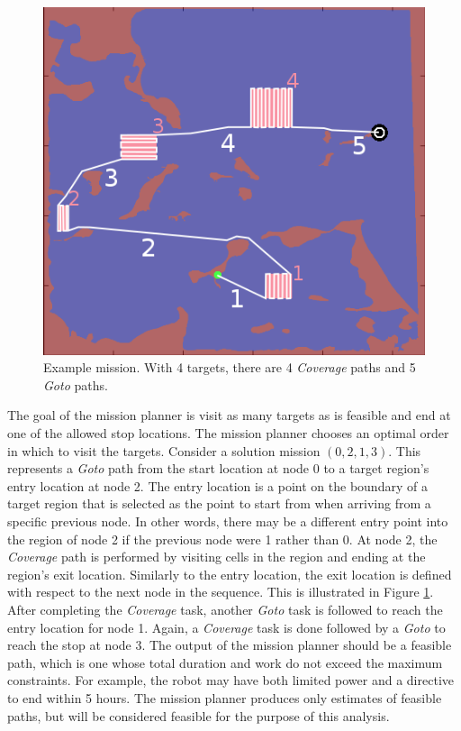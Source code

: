 \documentclass{tamuccthesis}
\begin{document}
\begin{figure}[H]
\includegraphics[]{nummissions.png}
\caption[Example mission.]{Example mission. With 4 targets, there are 4 \textit{Coverage} paths and 5 \textit{Goto} paths.}
\label{segment_example}
\end{figure}

The goal of the mission planner is visit as many targets as is feasible and end at one of the allowed stop locations.  The mission planner chooses an optimal order in which to visit the targets. Consider a solution mission $( 0, 2, 1, 3 )$. This represents a \textit{Goto} path from the start location at node 0 to a target region's entry location at node 2. The entry location is a point on the boundary of a target region that is selected as the point to start from when arriving from a specific previous node. In other words, there may be a different entry point into the region of node 2 if the previous node were 1 rather than 0. At node 2, the \textit{Coverage} path is performed by visiting cells in the region and ending at the region's exit location. Similarly to the entry location, the exit location is defined with respect to the next node in the sequence. This is illustrated in Figure \ref{segment_example}. After completing the \textit{Coverage} task, another \textit{Goto} task is followed to reach the entry location for node 1. Again, a \textit{Coverage} task is done followed by a \textit{Goto} to reach the stop at node 3. The output of the mission planner should be a feasible path, which is one whose total duration and work do not exceed the maximum constraints. For example, the robot may have both limited power and a directive to end within 5 hours. The mission planner produces only estimates of feasible paths, but will be considered feasible for the purpose of this analysis. 
\end{document}
